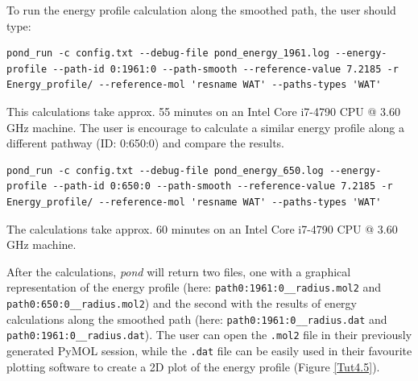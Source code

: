 \documentclass[9pt,tutorial]{livecoms}
\begin{document}
To run the energy profile calculation along the smoothed path, the user should type:
\begin{lstlisting}
pond_run -c config.txt --debug-file pond_energy_1961.log --energy-profile --path-id 0:1961:0 --path-smooth --reference-value 7.2185 -r Energy_profile/ --reference-mol 'resname WAT' --paths-types 'WAT'
\end{lstlisting}
This calculations take approx. 55 minutes on an Intel Core i7-4790 CPU @ 3.60 GHz machine.
The user is encourage to calculate a similar energy profile along a different pathway (ID: 0:650:0) and compare the results.
\begin{lstlisting}
pond_run -c config.txt --debug-file pond_energy_650.log --energy-profile --path-id 0:650:0 --path-smooth --reference-value 7.2185 -r Energy_profile/ --reference-mol 'resname WAT' --paths-types 'WAT'
\end{lstlisting}
The calculations take approx. 60 minutes on an Intel Core i7-4790 CPU @ 3.60 GHz machine.

After the calculations, \emph{pond} will return two files, one with a graphical representation of the energy profile (here: \texttt{path0:1961:0\_\_radius.mol2} and \texttt{path0:650:0\_\_radius.mol2}) and the second with the results of energy calculations along the smoothed path (here: \texttt{path0:1961:0\_\_radius.dat} and \texttt{path0:1961:0\_\_radius.dat}). The user can open the \texttt{.mol2} file in their previously generated PyMOL session, while the \texttt{.dat} file can be easily used in their favourite plotting software to create a 2D plot of the energy profile (Figure \ref{Tut4.5}).
\end{document}
